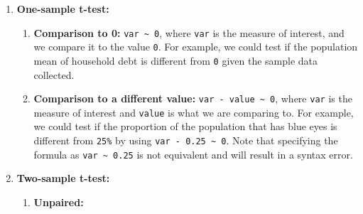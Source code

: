 \documentclass[
]{krantz}
\providecommand{\tightlist}{%
  \setlength{\itemsep}{0pt}\setlength{\parskip}{0pt}}
\begin{document}
\begin{enumerate}
\def\labelenumi{\arabic{enumi}.}
\tightlist
\item
  \textbf{One-sample t-test:}

  \begin{enumerate}
  \def\labelenumii{\alph{enumii}.}
  \tightlist
  \item
    \textbf{Comparison to 0:} \texttt{var\ \textasciitilde{}\ 0}, where \texttt{var} is the measure of interest, and we compare it to the value \texttt{0}. For example, we could test if the population mean of household debt is different from \texttt{0} given the sample data collected.
  \item
    \textbf{Comparison to a different value:} \texttt{var\ -\ value\ \textasciitilde{}\ 0}, where \texttt{var} is the measure of interest and \texttt{value} is what we are comparing to. For example, we could test if the proportion of the population that has blue eyes is different from \texttt{25\%} by using \texttt{var\ -\ 0.25\ \textasciitilde{}\ 0}. Note that specifying the formula as \texttt{var\ \textasciitilde{}\ 0.25} is not equivalent and will result in a syntax error.
  \end{enumerate}
\item
  \textbf{Two-sample t-test:}

  \begin{enumerate}
  \def\labelenumii{\alph{enumii}.}
  \tightlist
  \item
    \textbf{Unpaired:}


\end{enumerate}
\end{enumerate}
\end{document}
